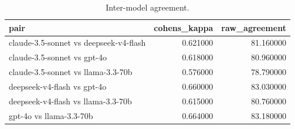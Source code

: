 \begin{table}
\caption{Inter-model agreement.}
\label{tab:agreement}
\begin{tabular}{lrr}
\toprule
pair & cohens_kappa & raw_agreement \\
\midrule
claude-3.5-sonnet vs deepseek-v4-flash & 0.621000 & 81.160000 \\
claude-3.5-sonnet vs gpt-4o & 0.618000 & 80.960000 \\
claude-3.5-sonnet vs llama-3.3-70b & 0.576000 & 78.790000 \\
deepseek-v4-flash vs gpt-4o & 0.660000 & 83.030000 \\
deepseek-v4-flash vs llama-3.3-70b & 0.615000 & 80.760000 \\
gpt-4o vs llama-3.3-70b & 0.664000 & 83.180000 \\
\bottomrule
\end{tabular}
\end{table}
